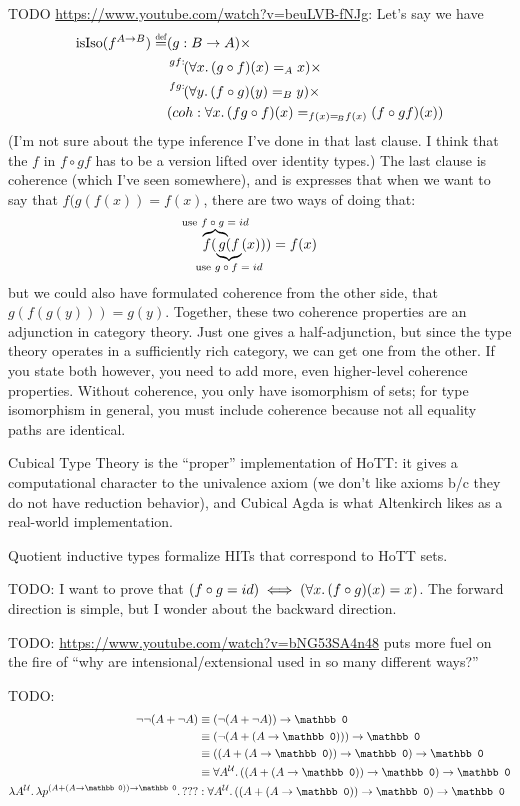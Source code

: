 \documentclass[11pt]{article} %
\theoremstyle{definition}
\theoremstyle{remark}
\begin{document}
TODO \url{https://www.youtube.com/watch?v=beuLVB-fNJg}:
Let's say we have
  \begin{align*}
  \mathrm{isIso}(f^{A \to B}) \defeq &
  \deptimes{g}{B \to A} \\&
  \vardeptimes{gf}{(\all{x}(g \circ f)(x) =_A x)} \\&
  \vardeptimes{fg}{(\all{y}(f \circ g)(y) =_B y)} \\&
  ( coh : \all{x} (fg \circ f)(x) =_{f(x) =_{\!B} f(x)} (f \circ gf)(x) )
  \end{align*}
(I'm not sure about the type inference I've done in that last clause. I think that the $f$ in $f \circ gf$ has to be a version lifted over identity types.)
The last clause is coherence (which I've seen somewhere), and is expresses that when we want to say that $f(g(f(x)) = f(x)$, there are two ways of doing that:
  $$\lefteqn{
    \overbrace{\phantom{f(g}}^{\mathclap{\text{use $f \circ g = id$}}}
  }
  f(\underbrace{g(f}_{\mathclap{\text{use $g \circ f = id$}}}(x))) = f(x)
  $$
but we could also have formulated coherence from the other side, that $g(f(g(y))) = g(y)$.
Together, these two coherence properties are an adjunction in category theory.
Just one gives a half-adjunction, but since the type theory operates in a sufficiently rich category, we can get one from the other.
If you state both however, you need to add more, even higher-level coherence properties.
Without coherence, you only have isomorphism of sets; for type isomorphism in general, you must include coherence because not all equality paths are identical.


Cubical Type Theory is the ``proper'' implementation of HoTT: it gives a computational character to the univalence axiom (we don't like axioms b/c they do not have reduction behavior), and Cubical Agda is what Altenkirch likes as a real-world implementation.

Quotient inductive types formalize HITs that correspond to HoTT sets.

TODO:
I want to prove that $(f \circ g = id) \iff ({\forall}{x}.\, (f \circ g)(x) = x)$.
The forward direction is simple, but I wonder about the backward direction.

TODO:
\url{https://www.youtube.com/watch?v=bNG53SA4n48} puts more fuel on the fire of ``why are intensional/extensional used in so many different ways?''

TODO:
\begin{align*}
\lnot\lnot(A + \lnot A)
  &\equiv (\lnot(A + \lnot A)) \to \mathbb 0 \\
  &\equiv (\lnot(A + (A \to \mathbb 0))) \to \mathbb 0 \\
  &\equiv ((A + (A \to \mathbb 0)) \to \mathbb 0) \to \mathbb 0 \\
  &\equiv \all{A^\U} ((A + (A \to \mathbb 0)) \to \mathbb 0) \to \mathbb 0 \\
\fun{A^\U}\fun{p^{(A + (A \to \mathbb 0)) \to \mathbb 0}} ???
  &: \all{A^\U} ((A + (A \to \mathbb 0)) \to \mathbb 0) \to \mathbb 0 \\
\end{align*}
\end{document}
